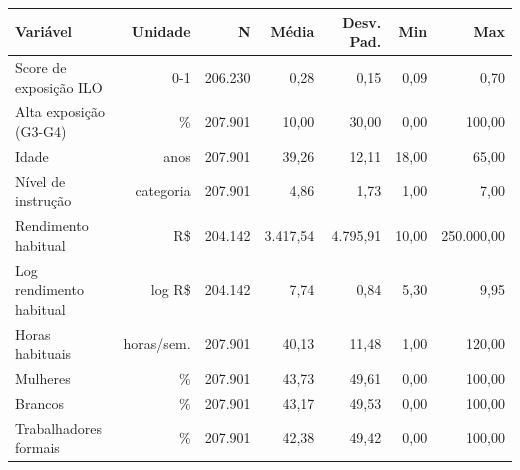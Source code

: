 \scriptsize
\begin{tabular}{lrrrrrr}
\toprule
Variável & Unidade & N & Média & Desv. Pad. & Min & Max \\
\midrule
Score de exposição ILO & 0-1 & 206.230 & 0,28 & 0,15 & 0,09 & 0,70 \\
Alta exposição (G3-G4) & \% & 207.901 & 10,00 & 30,00 & 0,00 & 100,00 \\
Idade & anos & 207.901 & 39,26 & 12,11 & 18,00 & 65,00 \\
Nível de instrução & categoria & 207.901 & 4,86 & 1,73 & 1,00 & 7,00 \\
Rendimento habitual & R\$ & 204.142 & 3.417,54 & 4.795,91 & 10,00 & 250.000,00 \\
Log rendimento habitual & log R\$ & 204.142 & 7,74 & 0,84 & 5,30 & 9,95 \\
Horas habituais & horas/sem. & 207.901 & 40,13 & 11,48 & 1,00 & 120,00 \\
Mulheres & \% & 207.901 & 43,73 & 49,61 & 0,00 & 100,00 \\
Brancos & \% & 207.901 & 43,17 & 49,53 & 0,00 & 100,00 \\
Trabalhadores formais & \% & 207.901 & 42,38 & 49,42 & 0,00 & 100,00 \\
\bottomrule
\end{tabular}
